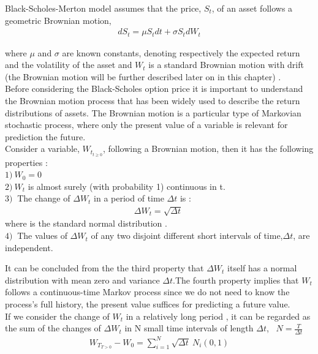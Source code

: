 \documentclass[12pt]{report}
\begin{document}
Black-Scholes-Merton model assumes that the price, $S_t$, of an asset follows a geometric Brownian motion,
\begin{gather}
dS_t = \mu S_tdt +\sigma S_tdW_t
\end{gather}

where $\mu$ and $\sigma$ are known constants, 
denoting respectively the expected return and the volatility of the asset and $W_t$ is a standard Brownian motion with drift (the Brownian motion will be further described later on in this chapter) .\\


Before considering the Black-Scholes option price it is  important to understand the Brownian motion process that has been widely used to describe the return distributions of assets. The Brownian motion is a particular type of Markovian stochastic process, where only the present value of a variable is relevant for prediction the future.\\

Consider a variable, $W_{t_{t \geqslant 0}}$,  following a Brownian motion, then it has the following properties :\\
$1)~ W_0=0 $\\
$2)~W_t$ is almost surely (with probability 1) continuous in t.\\
$3)~$ The change of $\Delta W_t$ in a  period of time $\Delta t$ is : 
\begin{gather}
\Delta W_t= \sqrt{\Delta t}~
\end{gather}
where  is the standard normal distribution .\\
$4)~$ The values of $\Delta W_t$ of any two disjoint different short intervals of time,$\Delta t$, are independent.\\ 

It can be concluded from the the third property that $\Delta W_t$ itself has a normal distribution with mean zero and variance $\Delta t$.The fourth property implies that $W_t$ follows a continuous-time Markov process since we do not need to know  the process's full history, the present value suffices for predicting  a future value.\\

If we consider the change of $W_t$ in a relatively long period , it can be regarded as the sum of the changes of $\Delta W_t$ in N small time intervals of length $\Delta t$,~ $N=\frac{T}{\Delta t}$
 \begin{gather}
W_{T_{T>0}} -W_0= \sum\limits_{i=1}^N \sqrt{\Delta t}~ N_i(0,1)
\label{broawnian}  
 \end{gather}
\end{document}
